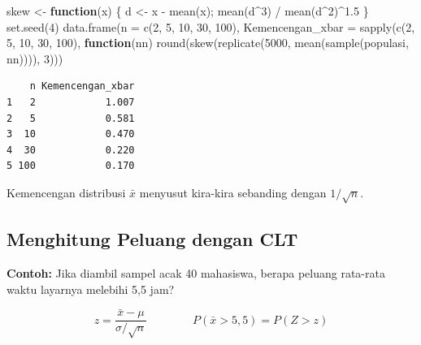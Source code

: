 \documentclass[
  indonesian,
  letterpaper,
]{book}
\newenvironment{Shaded}{\begin{snugshade}}{\end{snugshade}}
\newcommand{\AttributeTok}[1]{\textcolor[rgb]{0.40,0.45,0.13}{#1}}
\newcommand{\ControlFlowTok}[1]{\textcolor[rgb]{0.00,0.23,0.31}{\textbf{#1}}}
\newcommand{\DecValTok}[1]{\textcolor[rgb]{0.68,0.00,0.00}{#1}}
\newcommand{\FloatTok}[1]{\textcolor[rgb]{0.68,0.00,0.00}{#1}}
\newcommand{\FunctionTok}[1]{\textcolor[rgb]{0.28,0.35,0.67}{#1}}
\newcommand{\NormalTok}[1]{\textcolor[rgb]{0.00,0.23,0.31}{#1}}
\newcommand{\OtherTok}[1]{\textcolor[rgb]{0.00,0.23,0.31}{#1}}
\newcommand{\SpecialCharTok}[1]{\textcolor[rgb]{0.37,0.37,0.37}{#1}}
\begin{document}
\begin{Shaded}
\begin{Highlighting}[]
\NormalTok{skew }\OtherTok{\textless{}{-}} \ControlFlowTok{function}\NormalTok{(x) \{ d }\OtherTok{\textless{}{-}}\NormalTok{ x }\SpecialCharTok{{-}} \FunctionTok{mean}\NormalTok{(x); }\FunctionTok{mean}\NormalTok{(d}\SpecialCharTok{\^{}}\DecValTok{3}\NormalTok{) }\SpecialCharTok{/} \FunctionTok{mean}\NormalTok{(d}\SpecialCharTok{\^{}}\DecValTok{2}\NormalTok{)}\SpecialCharTok{\^{}}\FloatTok{1.5}\NormalTok{ \}}
\FunctionTok{set.seed}\NormalTok{(}\DecValTok{4}\NormalTok{)}
\FunctionTok{data.frame}\NormalTok{(}\AttributeTok{n =} \FunctionTok{c}\NormalTok{(}\DecValTok{2}\NormalTok{, }\DecValTok{5}\NormalTok{, }\DecValTok{10}\NormalTok{, }\DecValTok{30}\NormalTok{, }\DecValTok{100}\NormalTok{),}
           \AttributeTok{Kemencengan\_xbar =} \FunctionTok{sapply}\NormalTok{(}\FunctionTok{c}\NormalTok{(}\DecValTok{2}\NormalTok{, }\DecValTok{5}\NormalTok{, }\DecValTok{10}\NormalTok{, }\DecValTok{30}\NormalTok{, }\DecValTok{100}\NormalTok{), }\ControlFlowTok{function}\NormalTok{(nn)}
             \FunctionTok{round}\NormalTok{(}\FunctionTok{skew}\NormalTok{(}\FunctionTok{replicate}\NormalTok{(}\DecValTok{5000}\NormalTok{, }\FunctionTok{mean}\NormalTok{(}\FunctionTok{sample}\NormalTok{(populasi, nn)))), }\DecValTok{3}\NormalTok{)))}
\end{Highlighting}
\end{Shaded}

\begin{verbatim}
    n Kemencengan_xbar
1   2            1.007
2   5            0.581
3  10            0.470
4  30            0.220
5 100            0.170
\end{verbatim}

Kemencengan distribusi \(\bar{x}\) menyusut kira-kira sebanding dengan
\(1/\sqrt{n}\).

\subsection{Menghitung Peluang dengan
CLT}\label{menghitung-peluang-dengan-clt}

\textbf{Contoh:} Jika diambil sampel acak 40 mahasiswa, berapa peluang
rata-rata waktu layarnya melebihi 5,5 jam?

\[
z = \frac{\bar{x} - \mu}{\sigma/\sqrt{n}}
\qquad\qquad
P(\bar{x} > 5{,}5) = P(Z > z)
\]
\end{document}
